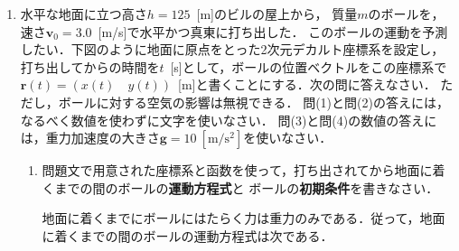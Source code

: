 \documentclass[a4paper,11pt]{ltjsarticle}
\begin{document}
\clearpage

\pagestyle{fancy}
\lhead{}
\rhead{}
\cfoot{\thepage}
\renewcommand{\headrulewidth}{0.0pt}

\setcounter{page}{1}

\begin{enumerate}[label={\LARGE \Roman*}]
    \item 水平な地面に立つ高さ$h=125$\ [m]のビルの屋上から，
    質量$m$のボールを，速さ$\bm{v}_0=3.0$\ [m/s]で水平かつ真東に打ち出した．
    このボールの運動を予測したい．下図のように地面に原点をとった2次元デカルト座標系を設定し，
    打ち出してからの時間を$t$\ [s]として，ボールの位置ベクトルをこの座標系で
    $\bm{r}(t)=(x(t) \quad y(t))$\ [m]と書くことにする．次の問に答えなさい．
    ただし，ボールに対する空気の影響は無視できる．
    問(1)と問(2)の答えには，なるべく数値を使わずに文字を使いなさい．
    問(3)と問(4)の数値の答えには，重力加速度の大きさ$\bm{g}=10\ [\mathrm{m/s^2}]$を使いなさい．


    \begin{center}
    \end{center}

    
    \begin{enumerate}[label=(\arabic*)]
        \item 問題文で用意された座標系と函数を使って，打ち出されてから地面に着くまでの間のボールの\textbf{運動方程式}と
        ボールの\textbf{初期条件}を書きなさい．

        \vspace{5pt}        

        地面に着くまでにボールにはたらく力は重力のみである．従って，地面に着くまでの間のボールの運動方程式は次である．


\end{enumerate}
\end{enumerate}
\end{document}

